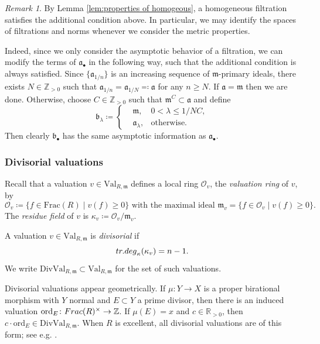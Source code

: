 \documentclass[11pt, leqno]{amsart}%
\theoremstyle{plain}
\theoremstyle{definition}
\theoremstyle{remark}
\newtheorem{remark}[theorem]{Remark}
\newcommand{\cO}{\mathcal{O}}
\newcommand{\bR}{\mathbb{R}}
\newcommand{\bZ}{\mathbb{Z}}
\newcommand{\fa}{\mathfrak{a}}
\newcommand{\fb}{\mathfrak{b}}
\newcommand{\fm}{\mathfrak{m}}
\newcommand{\ord}{\mathrm{ord}}
\newcommand{\Val}{\mathrm{Val}}
\newcommand{\DivVal}{\mathrm{DivVal}}
\numberwithin{equation}{section}
\begin{document}
\begin{remark}
    By Lemma \ref{lem:properties of homogeous}, a homogeneous filtration satisfies the additional condition above. In particular, we may identify the spaces of filtrations and norms whenever we consider the metric properties.
    

    Indeed, since we only consider the asymptotic behavior of a filtration, we can modify the terms of $\fa_\bullet$ in the following way, such that the additional condition is always satisfied. Since $\{\fa_{1/n}\}$ is an increasing sequence of $\fm$-primary ideals, there exists $N\in\bZ_{>0}$ such that $\fa_{1/n}=\fa_{1/N}\eqqcolon \fa$ for any $n\ge N$. If $\fa=\fm$ then we are done. Otherwise, choose $C\in\bZ_{>0}$ such that $\fm^C\subset\fa$ and define 
    \begin{equation*}
        \fb_\lambda\coloneqq\left\{\begin{aligned}
            &\fm, &0<\lambda\le 1/NC,\\
            &\fa_\lambda, &\text{otherwise.}
        \end{aligned}\right.
    \end{equation*}
    Then clearly $\fb_\bullet$ has the same asymptotic information as $\fa_\bullet$. 
\end{remark}





\subsubsection{Divisorial valuations}
Recall that a valuation $v\in\Val_{R,\fm}$ defines a local ring $\cO_v$, the \emph{valuation ring} of $v$, by
\[
    \cO_v\coloneqq \{f\in \mathrm{Frac}(R)\mid v(f)\ge 0\} \text{ with the maximal ideal } \fm_v=\{f\in \cO_v\mid v(f)\ge 0\}.
\]
The \emph{residue field} of $v$ is $\kappa_v\coloneqq \cO_v/\fm_v$.


A valuation $v\in \Val_{R,\fm}$ is \emph{divisorial} if 
\[
{\rm tr.deg}_{\kappa}(\kappa_v) =n-1.
\]
We write $\DivVal_{R,\fm}\subset \Val_{R,\fm}$ for the set of such valuations.

Divisorial valuations appear geometrically.  
If $\mu:Y\to X$ is a proper birational morphism with $Y$ normal and  $E\subset Y$ a prime divisor, 
then there is an induced valuation  $\ord_{E} \colon {\rm Frac}(R)^\times \to \bZ$. 
If $\mu(E) =x$ and  $c\in \bR_{>0}$, then $c\cdot \ord_E \in \DivVal_{R,\fm}$.
When $R$ is excellent, all divisorial valuations are of this form; see e.g. \cite[Lemma 6.5]{CS22}.
\end{document}
